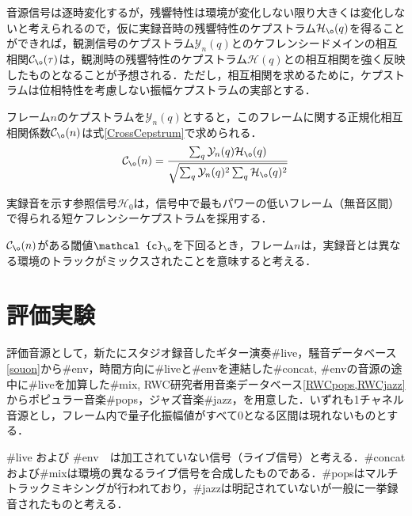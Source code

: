 \documentclass[technicalreport]{ieicej}
\begin{document}
音源信号は逐時変化するが，残響特性は環境が変化しない限り大きくは変化しない\cite{yYyOyY_ExtRTFbHSP_MASJ2014s}と考えられるので，仮に実録音時の残響特性のケプストラム$\mathcal{H}_{\o}(q)$を得ることができれば，観測信号のケプストラム$\mathcal{Y}_{n}(q)$とのケフレンシードメインの相互相関$\mathcal{C}_{\o}(\tau)$は，観測時の残響特性のケプストラム$\mathcal{H}(q)$との相互相関を強く反映したものとなることが予想される．ただし，相互相関を求めるために，ケプストラムは位相特性を考慮しない振幅ケプストラムの実部とする．

フレーム$n$のケプストラムを$\mathcal{Y}_{n}(q)$とすると，このフレームに関する正規化相互相関係数$\mathcal{C}_{\o}(n)$は式\eqref{CrossCepstrum}で求められる．
\begin{gather}
\mathcal{C}_{\o}(n) 
= \frac{%
	\sum_{q}\mathcal{Y}_{n}(q)\mathcal{H}_{\o}(q)
}{%
\sqrt{\sum_{q}\mathcal{Y}_{n}(q)^2\sum_{q}\mathcal{H}_{\o}(q)^2}
} \label{CrossCepstrum}
\end{gather}

実録音を示す参照信号$\mathcal{H}_0$は，信号中で最もパワーの低いフレーム（無音区間）で得られる短ケフレンシーケプストラムを採用する．

$\mathcal{C}_{\o}(n)$がある閾値$\mathcal{c}_{\o}$を下回るとき，フレーム$n$は，実録音とは異なる環境のトラックがミックスされたことを意味すると考える．

\section{評価実験}

評価音源として，新たにスタジオ録音したギター演奏\#live，騒音データベース\ref{souon}から\#env，時間方向に\#liveと\#envを連結した\#concat, \#envの音源の途中に\#liveを加算した\#mix, RWC研究者用音楽データベース\ref{RWCpops,RWCjazz}からポピュラー音楽\#pops，ジャズ音楽\#jazz，を用意した．いずれも1チャネル音源とし，フレーム内で量子化振幅値がすべて0となる区間は現れないものとする．

\#live および \#env　は加工されていない信号（ライブ信号）と考える．\#concatおよび\#mixは環境の異なるライブ信号を合成したものである．\#popsはマルチトラックミキシングが行われており，\#jazzは明記されていないが一般に一挙録音されたものと考える．
\end{document}
